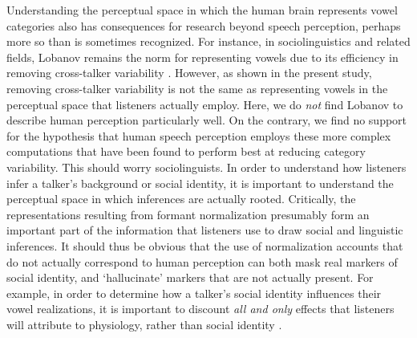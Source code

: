 \documentclass[preprint]{JASA}
\begin{document}
Understanding the perceptual space in which the human brain represents vowel categories also has consequences for research beyond speech perception, perhaps more so than is sometimes recognized. For instance, in sociolinguistics and related fields, Lobanov remains the norm for representing vowels due to its efficiency in removing cross-talker variability \citep[for review, see][]{adank2004, barreda2021}. However, as shown in the present study, removing cross-talker variability is not the same as representing vowels in the perceptual space that listeners actually employ. Here, we do \emph{not} find Lobanov to describe human perception particularly well. On the contrary, we find no support for the hypothesis that human speech perception employs these more complex computations that have been found to perform best at reducing category variability. This should worry sociolinguists. In order to understand how listeners infer a talker's background or social identity, it is important to understand the perceptual space in which inferences are actually rooted. Critically, the representations resulting from formant normalization presumably form an important part of the information that listeners use to draw social and linguistic inferences. It should thus be obvious that the use of normalization accounts that do not actually correspond to human perception can both mask real markers of social identity, and `hallucinate' markers that are not actually present. For example, in order to determine how a talker's social identity influences their vowel realizations, it is important to discount \emph{all and only} effects that listeners will attribute to physiology, rather than social identity \citep{disner1980, hindle1978}.
\end{document}

